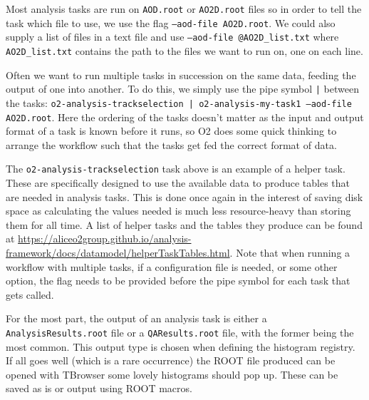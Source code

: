 Most analysis tasks are run on \texttt{AOD.root} or \texttt{AO2D.root} files so in order to tell the task which file to use, we use the flag \texttt{--aod-file AO2D.root}. We could also supply a list of files in a text file and use \texttt{--aod-file @AO2D\_list.txt} where \texttt{AO2D\_list.txt} contains the path to the files we want to run on, one on each line. 

Often we want to run multiple tasks in succession on the same data, feeding the output of one into another. To do this, we simply use the pipe symbol \texttt{|} between the tasks: \texttt{o2-analysis-trackselection | o2-analysis-my-task1 --aod-file AO2D.root}. Here the ordering of the tasks doesn't matter as the input and output format of a task is known before it runs, so O2 does some quick thinking to arrange the workflow such that the tasks get fed the correct format of data.

The \texttt{o2-analysis-trackselection} task above is an example of a helper task. These are specifically designed to use the available data to produce tables that are needed in analysis tasks. This is done once again in the interest of saving disk space as calculating the values needed is much less resource-heavy than storing them for all time. A list of helper tasks and the tables they produce can be found at \url{https://aliceo2group.github.io/analysis-framework/docs/datamodel/helperTaskTables.html}. Note that when running a workflow with multiple tasks, if a configuration file is needed, or some other option, the flag needs to be provided before the pipe symbol for each task that gets called.

For the most part, the output of an analysis task is either a \texttt{AnalysisResults.root} file or a \texttt{QAResults.root} file, with the former being the most common. This output type is chosen when defining the histogram registry. If all goes well (which is a rare occurrence) the ROOT file produced can be opened with TBrowser some lovely histograms should pop up. These can be saved as is or output using ROOT macros. 